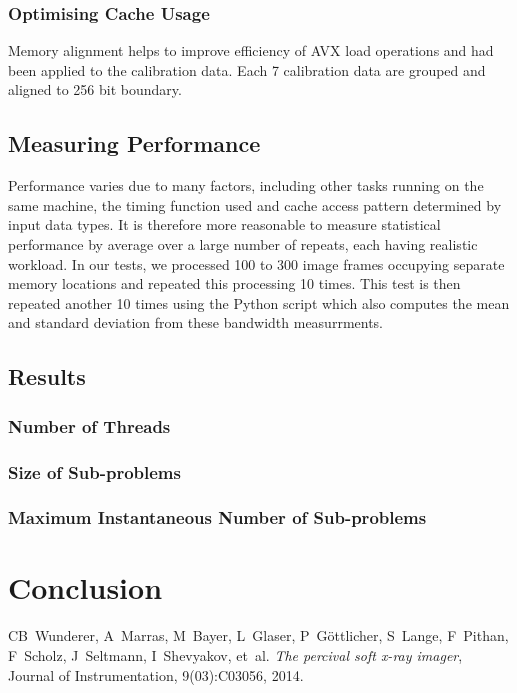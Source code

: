 \documentclass[journal]{IEEEtran}
\begin{document}
\subsubsection{Optimising Cache Usage}
Memory alignment helps to improve efficiency of AVX load operations and had been applied to the calibration data. Each 7 calibration data are grouped and aligned to 256 bit boundary.

\subsection{Measuring Performance}
Performance varies due to many factors, including other tasks running on the same machine, the timing function used and cache access pattern determined by input data types. It is therefore more reasonable to measure statistical performance by average over a large number of repeats, each having realistic workload. In our tests, we processed 100 to 300 image frames occupying separate memory locations and repeated this processing 10 times. This test is then repeated another 10 times using the Python script which also computes the mean and standard deviation from these bandwidth measurrments.

\subsection{Results}
\subsubsection{Number of Threads}
\subsubsection{Size of Sub-problems}
\subsubsection{Maximum Instantaneous Number of Sub-problems}

\section{Conclusion}	%


%
%
%

\begin{thebibliography}{1}

CB~Wunderer, A~Marras, M~Bayer, L~Glaser, P~G{\"o}ttlicher, S~Lange, F~Pithan,
  F~Scholz, J~Seltmann, I~Shevyakov, et~al.
\emph{The percival soft x-ray imager}, Journal of Instrumentation, 9(03):C03056, 2014.

\end{thebibliography}
\end{document}
